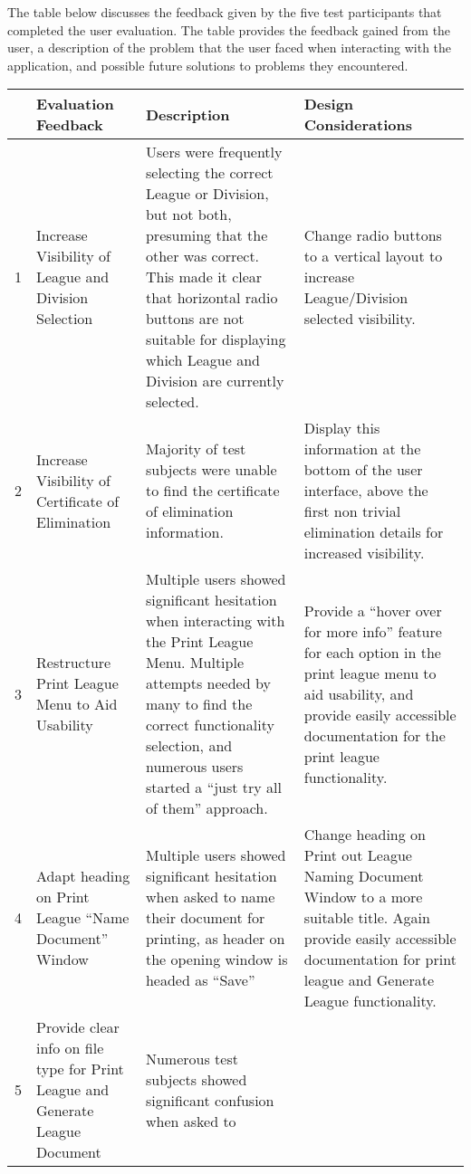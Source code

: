 The table below discusses the feedback given by the five test participants that
completed the user evaluation. The table provides the feedback gained from the
user, a description of the problem that the user faced when interacting with
the application, and possible future solutions to problems they encountered.

\begin{table}[t]
\begin{tabular}{|l|p{}|p{}|p{}|}
\hline
 & Evaluation Feedback & Description & Design Considerations  \\
\hline
1 & Increase Visibility of League and Division Selection & Users were frequently
selecting the correct League or Division, but not both, presuming that the other
was correct. This made it clear that horizontal radio buttons are not suitable
for displaying which League and Division are currently selected. & Change radio
buttons to a vertical layout to increase League/Division selected visibility.\\
\hline
2 & Increase Visibility of Certificate of Elimination & Majority of test
subjects were unable to find the certificate of elimination information. &
Display this information at the bottom of the user interface, above the first
non trivial elimination details for increased visibility.\\
\hline
3 & Restructure Print League Menu to Aid Usability & Multiple users showed
significant hesitation when interacting with the Print League Menu. Multiple
attempts needed by many to find the correct functionality selection, and
numerous users started a ``just try all of them'' approach. & Provide a ``hover
over for more info'' feature for each option in the print league menu to aid
usability, and provide easily accessible documentation for the print league
functionality.\\
\hline
4 & Adapt heading on Print League ``Name Document'' Window & Multiple users
showed significant hesitation when asked to name their document for printing, as
header on the opening window is headed as ``Save'' & Change heading on Print out
League Naming Document Window to a more suitable title. Again provide easily
accessible documentation for print league and Generate League functionality.\\
\hline
5 & Provide clear info on file type for Print League and Generate League
Document & Numerous test subjects showed significant confusion when asked to

\end{tabular}
\end{table}
